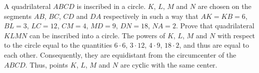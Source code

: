 \problem
A quadrilateral $ABCD$ is inscribed in a circle.
$K$, $L$, $M$ and $N$ are chosen on the segments $AB$, $BC$, $CD$ and $DA$
respectively in such a way that
$AK = KB = 6$, $BL = 3$, $LC = 12$, $CM = 4$, $MD = 9$, $DN = 18$, $NA = 2$.
Prove that quadrilateral $KLMN$ can be inscribed into a circle.
\solution
The powers of $K$, $L$, $M$ and $N$ with respect to the circle equal to the
quantities $6 \cdot 6$, $3 \cdot 12$, $4 \cdot 9$, $18 \cdot 2$, and thus are
equal to each other.
Consequently, they are equidistant from the circumcenter of the $ABCD$.
Thus, points $K$, $L$, $M$ and $N$ are cyсlic with the same center.
\endproblem
